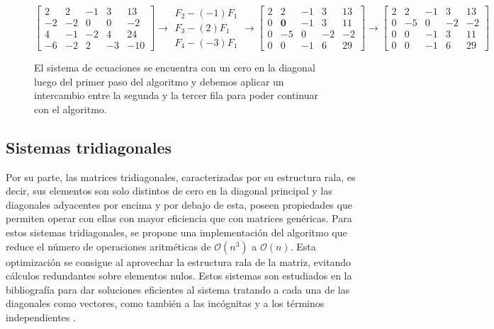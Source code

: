 \begin{figure}
    $$
    \left[\begin{array}{cccc|c}
    2 & 2 & -1 & 3 & 13 \\
    -2 & -2 & 0 & 0 & -2 \\
    4 & -1 & -2 & 4 & 24 \\
    -6 & -2 & 2 & -3 & -10
    \end{array}\right] \rightarrow \begin{gathered}
    F_2-(-1) F_1 \\
    F_3-(2) F_1 \\
    F_4-(-3) F_1
    \end{gathered} \longrightarrow\left[\begin{array}{cccc|c}
    2 & 2 & -1 & 3 & 13 \\
    0 & \textbf{0} & -1 & 3 & 11 \\
    0 & -5 & 0 & -2 & -2 \\
    0 & 0 & -1 & 6 & 29
    \end{array}\right]\longrightarrow\left[\begin{array}{cccc|c}
    2 & 2 & -1 & 3 & 13 \\
    0 & -5 & 0 & -2 & -2 \\
    0 & 0 & -1 & 3 & 11 \\
    0 & 0 & -1 & 6 & 29
    \end{array}\right]
    $$
    \label{fig:pivoting}
    \caption{El sistema de ecuaciones se encuentra con un cero en la diagonal luego del primer paso del algoritmo y debemos aplicar un intercambio entre la segunda y la tercer fila para poder continuar con el algoritmo.}

\end{figure}

\subsection{Sistemas tridiagonales}

Por su parte, las matrices tridiagonales, caracterizadas por su estructura rala, es decir, sus elementos son solo distintos de cero en la diagonal principal y las diagonales adyacentes por encima y por debajo de esta, poseen propiedades que permiten operar con ellas con mayor eficiencia que con matrices genéricas. Para estos sistemas tridiagonales, se propone una implementación del algoritmo que reduce el número de operaciones aritméticas de $\mathcal{O}(n^3)$ a $\mathcal{O}(n)$. Esta optimización se consigue al aprovechar la estructura rala de la matriz, evitando cálculos redundantes sobre elementos nulos. Estos sistemas son estudiados en la bibliografía para dar soluciones eficientes al sistema tratando a cada una de las diagonales como vectores, como también a las incógnitas y a los términos independientes \cite{Recipes07}. 

